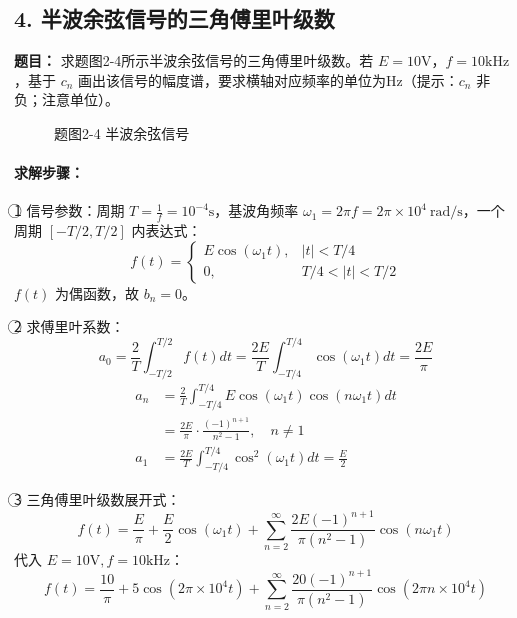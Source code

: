 \subsection{4. 半波余弦信号的三角傅里叶级数}
\textbf{题目：} 求题图2-4所示半波余弦信号的三角傅里叶级数。若 \( E=10\mathrm{V} \)，\( f=10\mathrm{kHz} \)，基于 \( c_n \) 画出该信号的幅度谱，要求横轴对应频率的单位为Hz（提示：$c_n$ 非负；注意单位）。

\begin{figure}[htbp]
\centering
{}
\caption{题图2-4 半波余弦信号}
\end{figure}

\paragraph{求解步骤：}
\textcircled{1} 信号参数：周期 \( T = \frac{1}{f} = 10^{-4}\mathrm{s} \)，基波角频率 \( \omega_1 = 2\pi f = 2\pi\times10^4 \ \mathrm{rad/s} \)，一个周期 \( [-T/2,T/2] \) 内表达式：
\[
f(t) =
\begin{cases}
E\cos(\omega_1 t), & |t| < T/4 \\
0, & T/4 < |t| < T/2
\end{cases}
\]
\( f(t) \) 为偶函数，故 \( b_n=0 \)。

\textcircled{2} 求傅里叶系数：
\[
a_0 = \frac{2}{T}\int_{-T/2}^{T/2} f(t)dt = \frac{2E}{T}\int_{-T/4}^{T/4} \cos(\omega_1 t)dt = \frac{2E}{\pi}
\]
\[
\begin{aligned}
a_n &= \frac{2}{T}\int_{-T/4}^{T/4} E\cos(\omega_1 t)\cos(n\omega_1 t)dt \\
&= \frac{2E}{\pi}\cdot\frac{(-1)^{n+1}}{n^2-1}, \quad n\neq1 \\
a_1 &= \frac{2E}{T}\int_{-T/4}^{T/4} \cos^2(\omega_1 t)dt = \frac{E}{2}
\end{aligned}
\]

\textcircled{3} 三角傅里叶级数展开式：
\[
\boxed{f(t) = \frac{E}{\pi} + \frac{E}{2}\cos(\omega_1 t) + \sum_{n=2}^{\infty} \frac{2E(-1)^{n+1}}{\pi(n^2-1)} \cos(n\omega_1 t)}
\]
代入 \( E=10\mathrm{V}, f=10\mathrm{kHz} \)：
\[
f(t) = \frac{10}{\pi} + 5\cos(2\pi\times10^4 t) + \sum_{n=2}^{\infty} \frac{20(-1)^{n+1}}{\pi(n^2-1)} \cos(2\pi n\times10^4 t)
\]

